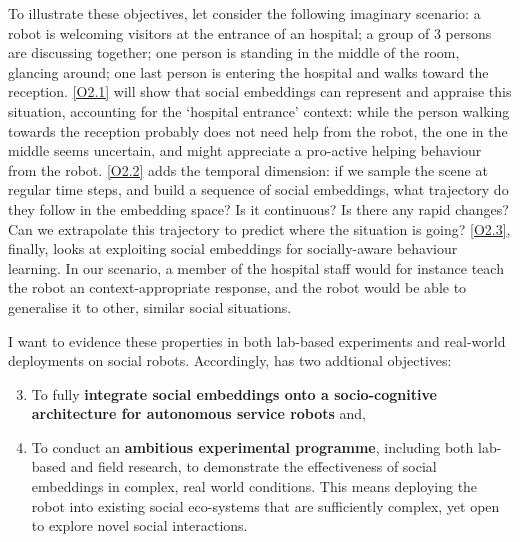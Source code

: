 \noindent To illustrate these objectives, let consider the following imaginary
scenario: a robot is welcoming visitors at the entrance of an hospital; a group
of 3 persons are discussing together; one person is standing in the middle of
the room, glancing around; one last person is entering the hospital and
walks toward the reception. \ref{O2.1} will show that social embeddings can
represent and appraise this situation, accounting for the `hospital entrance' context: while
the person walking towards the reception probably does not need help from the
robot, the one in the middle seems uncertain, and might appreciate a pro-active
helping behaviour from the robot. \ref{O2.2} adds the temporal dimension: if we
sample the scene at regular time steps, and build a sequence of social
embeddings, what trajectory do they follow in the embedding space? Is it
continuous? Is there any rapid changes? Can we extrapolate this trajectory to
predict where the situation is going? \ref{O2.3}, finally, looks at exploiting
social embeddings for socially-aware behaviour learning. In our scenario, a
member of the hospital staff would for instance teach the robot an
context-appropriate response, and the robot would be able to generalise it to
other, similar social situations.


I want to evidence these properties in both lab-based experiments and
real-world deployments on social robots. Accordingly, \project has two addtional
objectives:

\begin{enumerate}[label=\textbf{O\arabic*}]
    \setcounter{enumi}{2}
    \item \label{O3} To fully {\bf integrate social embeddings onto a
        socio-cognitive architecture for autonomous service robots} and,

    \item \label{O4} To conduct an {\bf ambitious experimental programme},
        including both lab-based and field research, to demonstrate the
        effectiveness of social embeddings in complex, real world conditions.
        This means deploying the \project robot into existing social eco-systems
        that are sufficiently complex, yet open to explore novel social interactions.
\end{enumerate}


%


